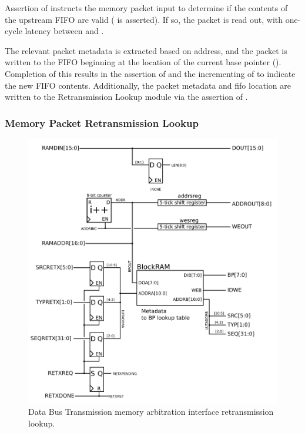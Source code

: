 Assertion of  instructs the memory packet input to
determine if the contents of the upstream FIFO are valid
( is asserted). If so, the packet is read out, with
one-cycle latency between  and
.

 The relevant packet metadata is extracted based on
address, and the packet is written to the FIFO beginning at the
location of the current base pointer (). Completion of
this results in the assertion of  and the incrementing of
 to indicate the new FIFO contents.  Additionally, the
packet metadata and fifo location are written to the Retransmission
Lookup module via the assertion of .

\subsubsection{Memory Packet Retransmission Lookup} 
\begin{figure}
\begin{centering}
\includegraphics[scale=0.8]{memarbit.retx.svg}
\end{centering}
\caption{Data Bus Transmission memory arbitration interface retransmission lookup.}
\label{memarbit.retx}
\end{figure}

